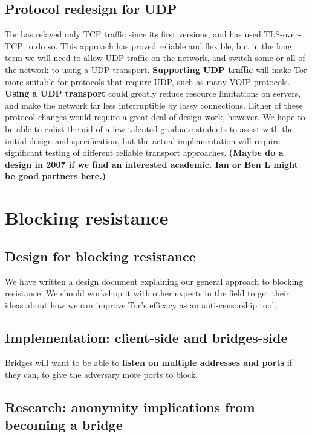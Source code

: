 \documentclass{article}
\newcommand{\plan}[1]{ {\bf (#1)}}
\begin{document}
\subsection{Protocol redesign for UDP}
Tor has relayed only TCP traffic since its first versions, and has used
TLS-over-TCP to do so.  This approach has proved reliable and flexible, but
in the long term we will need to allow UDP traffic on the network, and switch
some or all of the network to using a UDP transport.  {\bf Supporting UDP
  traffic} will make Tor more suitable for protocols that require UDP, such
as many VOIP protocols.  {\bf Using a UDP transport} could greatly reduce
resource limitations on servers, and make the network far less interruptible
by lossy connections.  Either of these protocol changes would require a great
deal of design work, however.  We hope to be able to enlist the aid of a few
talented graduate students to assist with the initial design and
specification, but the actual implementation will require significant testing
of different reliable transport approaches.\plan{Maybe do a design in 2007 if
we find an interested academic.  Ian or Ben L might be good partners here.}

\section{Blocking resistance}

\subsection{Design for blocking resistance}
We have written a design document explaining our general approach to blocking
resistance.  We should workshop it with other experts in the field to get
their ideas about how we can improve Tor's efficacy as an anti-censorship
tool.

\subsection{Implementation: client-side and bridges-side}

Bridges will want to be able to {\bf listen on multiple addresses and ports}
if they can, to give the adversary more ports to block.

\subsection{Research: anonymity implications from becoming a bridge}
\end{document}
